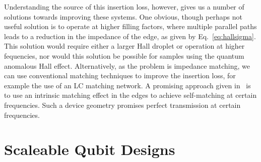 Understanding the source of this insertion loss, however, gives us a number of solutions towards improving these systems. One obvious, though perhaps
not useful solution is to operate at higher filling factors, where multiple parallel paths leads to a reduction in the impedance of the edge, as
given by Eq.~\ref{eq:hallsigma}. This solution would require either a larger Hall droplet or operation at higher fequencies, nor would this solution
be possible for samples using the quantum anomalous Hall effect. Alternatively, as the problem is impedance matching, we can use conventional matching
techniques to improve the insertion loss, for example the use of an LC matching network. A promising approach given in~\cite{bosco2016self} is to use
an intrinsic matching effect in the edges to achieve self-matching at certain frequencies. Such a device geometry promises perfect transmission at certain
frequencies.

\section{Scaleable Qubit Designs}

